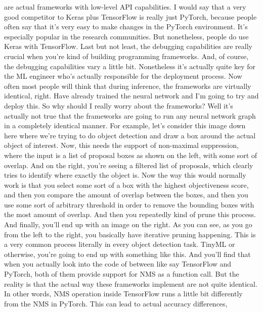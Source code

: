 {{{{{    are actual frameworks with low-level API capabilities.
    I would say that a very good competitor to Keras plus TensorFlow
    is really just PyTorch, because people often
    say that it's very easy to make changes in the PyTorch environment.
    It's especially popular in the research communities.
    But nonetheless, people do use Keras with TensorFlow.
    Last but not least, the debugging capabilities
    are really crucial when you're kind of building programming frameworks.
    And, of course, the debugging capabilities vary a little bit.
    Nonetheless it's actually quite key for the ML engineer who's actually
    responsible for the deployment process.
    Now often most people will think that during inference,
    the frameworks are virtually identical, right.
    Have already trained the neural network and I'm going to try and deploy this.
    So why should I really worry about the frameworks?
    Well it's actually not true that the frameworks
    are going to run any neural network graph in a completely identical manner.
    For example, let's consider this image down here
    where we're trying to do object detection
    and draw a box around the actual object of interest.
    Now, this needs the support of non-maximal suppression,
    where the input is a list of proposal boxes as shown on the left,
    with some sort of overlap.
    And on the right, you're seeing a filtered list
    of proposals, which clearly tries to identify where exactly the object is.
    Now the way this would normally work is that you
    select some sort of a box with the highest objectiveness score,
    and then you compare the amount of overlap between the boxes,
    and then you use some sort of arbitrary threshold
    in order to remove the bounding boxes with the most amount of overlap.
    And then you repeatedly kind of prune this process.
    And finally, you'll end up with an image on the right.
    As you can see, as you go from the left to the right,
    you basically have iterative pruning happening.
    This is a very common process literally in every object detection task.
    TinyML or otherwise, you're going to end up with something like this.
    And you'll find that when you actually look
    into the code of between like say TensorFlow and PyTorch, both of them
    provide support for NMS as a function call.
    But the reality is that the actual way these frameworks implement
    are not quite identical.
    In other words, NMS operation inside TensorFlow
    runs a little bit differently from the NMS in PyTorch.
    This can lead to actual accuracy differences,
}}}}}

